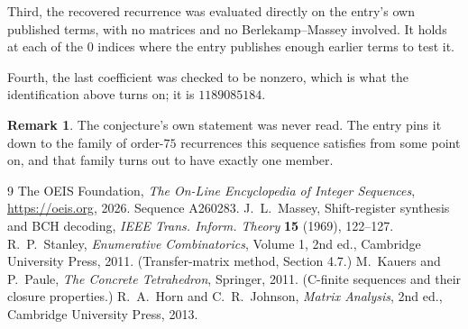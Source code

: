 \documentclass[11pt,a4paper]{article}
\theoremstyle{plain}
\theoremstyle{definition}
\newtheorem{remark}[theorem]{Remark}
\begin{document}
Third, the recovered recurrence was evaluated directly on the entry's own published terms, with
no matrices and no Berlekamp--Massey involved. It holds at each of the $0$ indices where
the entry publishes enough earlier terms to test it.

Fourth, the last coefficient was checked to be nonzero, which is what the identification above
turns on; it is $1189085184$.

\begin{remark}
The conjecture's own statement was never read. The entry pins it down to the family of
order-$75$ recurrences this sequence satisfies from some point on, and that family turns
out to have exactly one member.
\end{remark}

\begin{thebibliography}{9}
 The OEIS Foundation, \emph{The On-Line Encyclopedia of Integer
Sequences}, \url{https://oeis.org}, 2026. Sequence A260283.
 J.~L.~Massey, Shift-register synthesis and BCH decoding, \emph{IEEE
Trans. Inform. Theory} \textbf{15} (1969), 122--127.
 R.~P.~Stanley, \emph{Enumerative Combinatorics}, Volume 1, 2nd ed.,
Cambridge University Press, 2011. (Transfer-matrix method, Section 4.7.)
 M.~Kauers and P.~Paule, \emph{The Concrete Tetrahedron}, Springer, 2011.
(C-finite sequences and their closure properties.)
 R.~A.~Horn and C.~R.~Johnson, \emph{Matrix Analysis}, 2nd ed., Cambridge
University Press, 2013.
\end{thebibliography}
\end{document}
